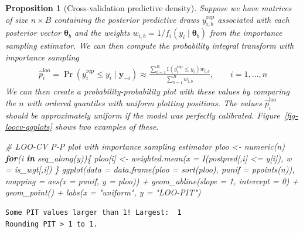 \documentclass[
  11pt,
  letterpaper,
]{scrbook}
\newenvironment{Shaded}{\begin{snugshade}}{\end{snugshade}}
\newcommand{\AttributeTok}[1]{\textcolor[rgb]{0.40,0.45,0.13}{#1}}
\newcommand{\CommentTok}[1]{\textcolor[rgb]{0.37,0.37,0.37}{#1}}
\newcommand{\ControlFlowTok}[1]{\textcolor[rgb]{0.00,0.23,0.31}{\textbf{#1}}}
\newcommand{\DecValTok}[1]{\textcolor[rgb]{0.68,0.00,0.00}{#1}}
\newcommand{\FunctionTok}[1]{\textcolor[rgb]{0.28,0.35,0.67}{#1}}
\newcommand{\NormalTok}[1]{\textcolor[rgb]{0.00,0.23,0.31}{#1}}
\newcommand{\OtherTok}[1]{\textcolor[rgb]{0.00,0.23,0.31}{#1}}
\newcommand{\SpecialCharTok}[1]{\textcolor[rgb]{0.37,0.37,0.37}{#1}}
\newcommand{\StringTok}[1]{\textcolor[rgb]{0.13,0.47,0.30}{#1}}
\theoremstyle{definition}
\theoremstyle{plain}
\newtheorem{proposition}{Proposition}[chapter]
\theoremstyle{plain}
\theoremstyle{plain}
\theoremstyle{definition}
\theoremstyle{definition}
\theoremstyle{plain}
\newtheorem{proposition}{Proposition}[chapter]
\theoremstyle{plain}
\theoremstyle{remark}
\begin{document}
\begin{proposition}[Cross-validation predictive
density]
Suppose we have matrices of size \(n \times B\) containing the posterior
predictive draws \(y_{i,b}^{\mathrm{rep}}\) associated with each
posterior vector \(\boldsymbol{\theta}_b\) and the weights
\(w_{i,b} = 1/f_i (y_i \mid \boldsymbol{\theta}_b)\) from the importance
sampling estimator. We can then compute the probability integral
transform with importance sampling \begin{align*}
\widehat{p}_i^{\mathrm{loo}} = \Pr(y_i^{\mathrm{rep}} \leq y_i \mid \boldsymbol{y}_{-i}) \approx \frac{\sum_{b=1}^B \mathrm{I}(y_i^{\mathrm{rep}} \leq y_i)w_{i,b}}{\sum_{b=1}^B w_{i,b}}, \qquad i =1,\ldots, n
\end{align*} We can then create a probability-probability plot with
these values by comparing the \(n\) with ordered quantiles with uniform
plotting positions. The values \(\widehat{p}_i^{\mathrm{loo}}\) should
be approximately uniform if the model was perfectly calibrated.
Figure~\ref{fig-loocv-qqplots} shows two examples of these.

\begin{Shaded}
\begin{Highlighting}[]
\CommentTok{\# LOO{-}CV P{-}P plot with importance sampling estimator}
\NormalTok{ploo }\OtherTok{\textless{}{-}} \FunctionTok{numeric}\NormalTok{(n)}
\ControlFlowTok{for}\NormalTok{(i }\ControlFlowTok{in} \FunctionTok{seq\_along}\NormalTok{(y))\{}
\NormalTok{ ploo[i] }\OtherTok{\textless{}{-}} \FunctionTok{weighted.mean}\NormalTok{(}\AttributeTok{x =} \FunctionTok{I}\NormalTok{(postpred[,i] }\SpecialCharTok{\textless{}=}\NormalTok{ y[i]), }\AttributeTok{w =}\NormalTok{ is\_wgt[,i])}
\NormalTok{\}}
\FunctionTok{ggplot}\NormalTok{(}\AttributeTok{data =} \FunctionTok{data.frame}\NormalTok{(}\AttributeTok{ploo =} \FunctionTok{sort}\NormalTok{(ploo), }\AttributeTok{punif =} \FunctionTok{ppoints}\NormalTok{(n)),}
       \AttributeTok{mapping =} \FunctionTok{aes}\NormalTok{(}\AttributeTok{x =}\NormalTok{ punif, }\AttributeTok{y =}\NormalTok{ ploo)) }\SpecialCharTok{+}
  \FunctionTok{geom\_abline}\NormalTok{(}\AttributeTok{slope =} \DecValTok{1}\NormalTok{, }\AttributeTok{intercept =} \DecValTok{0}\NormalTok{) }\SpecialCharTok{+} 
  \FunctionTok{geom\_point}\NormalTok{() }\SpecialCharTok{+}
  \FunctionTok{labs}\NormalTok{(}\AttributeTok{x =} \StringTok{"uniform"}\NormalTok{, }\AttributeTok{y =} \StringTok{"LOO{-}PIT"}\NormalTok{)}
\end{Highlighting}
\end{Shaded}

\begin{verbatim}
Some PIT values larger than 1! Largest:  1 
Rounding PIT > 1 to 1.
\end{verbatim}


\end{proposition}
\end{document}
